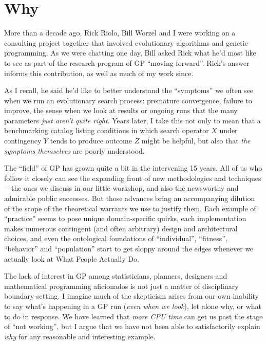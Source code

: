 \section{Why}\hypertarget{why}{}\label{why}

More than a decade ago, Rick Riolo, Bill Worzel and I were working on a consulting project together that involved evolutionary algorithms and genetic programming. As we were chatting one day, Bill asked Rick what he'd most like to see as part of the research program of GP ``moving forward''. Rick's answer informs this contribution, as well as much of my work since.

As I recall, he said he'd like to better understand the ``symptoms'' we often see when we run an evolutionary search process: premature convergence, failure to improve, the sense when we look at results or ongoing runs that the many parameters \emph{just aren't quite right}. Years later, I take this not only to mean that a benchmarking catalog listing conditions in which search operator $X$ under contingency $Y$ tends to produce outcome $Z$ might be helpful, but also that \emph{the symptoms themselves} are poorly understood.

The ``field'' of GP has grown quite a bit in the intervening 15 years. All of us who follow it closely can see the expanding front of new methodologies and techniques---the ones we discuss in our little workshop, and also the newsworthy and admirable public successes. But those advances bring an accompanying dilution of the scope of the theoretical warrants we use to justify them. Each example of ``practice'' seems to pose unique domain-specific quirks, each implementation makes numerous contingent (and often arbitrary) design and architectural choices, and even the ontological foundations of ``individual'', ``fitness'', ``behavior'' and ``population'' start to get sloppy around the edges whenever we actually look at What People Actually Do.

The lack of interest in GP among statisticians, planners, designers and mathematical programming aficionados is not just a matter of disciplinary boundary-setting. I imagine much of the skepticism arises from our own inability to say what's happening in a GP run (\emph{even when we look}), let alone why, or what to do in response. We have learned that \emph{more CPU time} can get us past the stage of ``not working'', but I argue that we have not been able to satisfactorily explain \emph{why} for any reasonable and interesting example.

